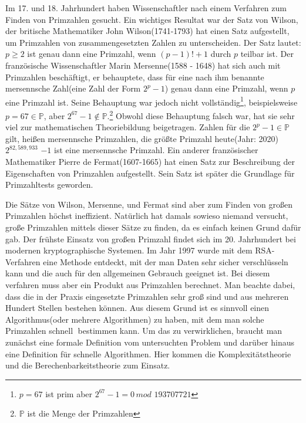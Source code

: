 \documentclass[12pt,oneside]{article}
\theoremstyle{remark}
\theoremstyle{definition}
\begin{document}
Im 17. und 18. Jahrhundert haben Wissenschaftler nach einem Verfahren zum Finden von Primzahlen gesucht. Ein wichtiges Resultat war der Satz von Wilson, der britische Mathematiker John Wilson(1741-1793) hat einen Satz aufgestellt, um Primzahlen von zusammengesetzten Zahlen zu unterscheiden. Der Satz lautet: $p \geq 2$ ist genau dann eine Primzahl, wenn $(p - 1)! + 1$ durch $p$ teilbar ist. Der französische Wissenschaftler Marin Mersenne(1588 - 1648) hat sich auch mit Primzahlen beschäftigt, er behauptete, dass für eine nach ihm benannte mersennsche Zahl(eine Zahl der Form $2^p - 1$) genau dann eine Primzahl, wenn $p$ eine Primzahl ist. Seine Behauptung war jedoch nicht vollständig\footnote{$p = 67$ ist prim aber $2^{67} - 1 = 0 \, mod \, \, 193707721$}, beispielsweise $ p = 67 \in \mathbb{P}$, aber $2^{67} - 1 \not \in \mathbb{P}$.\footnote{$\mathbb{P}$ ist die Menge der Primzahlen} Obwohl diese Behauptung falsch war, hat sie sehr viel zur mathematischen Theoriebildung beigetragen. Zahlen für die $2^p - 1 \in \mathbb{P}$ gilt, heißen mersennsche Primzahlen, die größte Primzahl heute(Jahr: 2020) $2^{82,589,933}$ $ - 1$ ist eine mersennsche Primzahl\cite{largePrimes}. Ein anderer französischer Mathematiker Pierre de Fermat(1607-1665) hat einen Satz zur Beschreibung der Eigenschaften von Primzahlen aufgestellt. Sein Satz ist später die Grundlage für Primzahltests geworden.
\newline

Die Sätze von Wilson, Mersenne, und Fermat sind aber zum Finden von großen Primzahlen höchst ineffizient. Natürlich hat damals sowieso niemand versucht, große Primzahlen mittels dieser Sätze zu finden, da es einfach keinen Grund dafür gab. Der frühste Einsatz von großen Primzahl findet sich im 20. Jahrhundert bei modernen kryptographische Systemen\cite{krypWiki}. Im Jahr 1997 wurde mit dem RSA-Verfahren eine Methode entdeckt, mit der man Daten sehr sicher verschlüsseln kann und die auch für den allgemeinen Gebrauch geeignet ist. Bei diesem verfahren muss aber ein Produkt aus Primzahlen berechnet\cite{rsa}. Man beachte dabei, dass die in der Praxis eingesetzte Primzahlen sehr groß sind und aus mehreren Hundert Stellen bestehen können. Aus diesem Grund ist es sinnvoll einen Algorithmus(oder mehrere Algorithmen) zu haben, mit dem man solche Primzahlen \textquotedbl schnell\textquotedbl   $\;$ bestimmen kann. Um das zu verwirklichen, braucht man zunächst eine formale Definition vom untersuchten Problem und darüber hinaus eine Definition für schnelle Algorithmen. Hier kommen die Komplexitätstheorie und die Berechenbarkeitstheorie zum Einsatz. 
\end{document}
